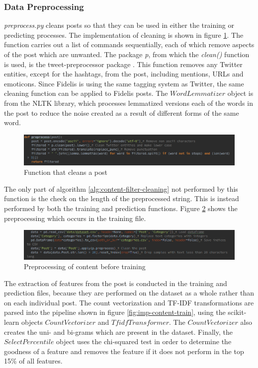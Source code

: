 \subsubsection{Data Preprocessing}
\textit{preprocess.py} cleans posts so that they can be used in either the training or predicting processes. The implementation of cleaning is shown in figure \ref{fig:content-clean}. The function carries out a list of commands sequentially, each of which remove aspects of the post which are unwanted. The package \textit{p}, from which the \textit{clean()} function is used, is the tweet-preprocessor package \cite{TweetPreprocessor}. This function removes any Twitter entities, except for the hashtags, from the post, including mentions, URLs and emoticons. Since Fidelis is using the same tagging system as Twitter, the same cleaning function can be applied to Fidelis posts. The $WordLemmatizer$ object is from the NLTK library, which processes lemmatized versions each of the words in the post to reduce the noise created as a result of different forms of the same word. 

\begin{figure}[H]
\centering
\includegraphics[width=\textwidth]{Images/Implementation/content-clean}
\caption{Function that cleans a post}
\label{fig:content-clean}
\end{figure}

The only part of algorithm \ref{alg:content-filter-cleaning} not performed by this function is the check on the length of the preprocessed string. This is instead performed by both the training and prediction functions. Figure \ref{fig:content-preprocess} shows the preprocessing which occurs in the training file.

\begin{figure}[H]
\centering
\includegraphics[width=\textwidth]{Images/Implementation/content-preprocess}
\caption{Preprocessing of content before training}
\label{fig:content-preprocess}
\end{figure}

The extraction of features from the post is conducted in the training and prediction files, because they are performed on the dataset as a whole rather than on each individual post. The count vectorization and TF-IDF transformations are parsed into the pipeline shown in figure \ref{fig:imp-content-train}, using the scikit-learn objects $CountVectorizer$ and $TfidfTransformer$. The $CountVectorizer$ also creates the uni- and bi-grams which are present in the dataset. Finally, the $SelectPercentile$ object uses the chi-squared test in order to determine the goodness of a feature and removes the feature if it does not perform in the top 15\% of all features.

